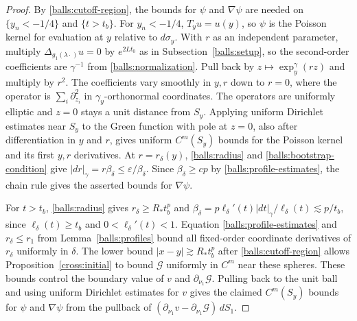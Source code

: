 \documentclass[11pt,a4paper]{article}
\theoremstyle{definition}
\theoremstyle{remark}
\numberwithin{equation}{section}
\begin{document}
\begin{proof}
By \eqref{balls:cutoff-region}, the bounds for $\psi$ and $\nabla\psi$
are needed on $\{y_n<-1/4\}$ and $\{t>t_b\}$. For $y_n<-1/4$,
$T_yu=u(y)$, so $\psi$ is the Poisson kernel for evaluation at $y$
relative to $d\sigma_y$. With $r$ as an independent parameter, multiply
$\Delta_{g_1(\lambda\cdot)}u=0$ by $e^{2Lt_0}$ as in
Subsection~\ref{balls:setup}, so the second-order coefficients are
$\gamma^{-1}$ from \eqref{balls:normalization}. Pull back by
$z\mapsto\exp_y^\gamma(rz)$ and multiply by $r^2$.
The coefficients vary smoothly in $y,r$ down to $r=0$, where the
operator is $\sum_i\partial_{z_i}^2$ in $\gamma_y$-orthonormal
coordinates. The operators are uniformly elliptic and $z=0$ stays
a unit distance from $S_y$. Applying uniform Dirichlet estimates
near $S_y$ to the Green function with pole at $z=0$, also after
differentiation in $y$ and $r$, gives uniform $C^m(S_y)$ bounds
for the Poisson kernel and its first $y,r$ derivatives.
At $r=r_\delta(y)$, \eqref{balls:radius} and
\eqref{balls:bootstrap-condition} give
$|dr|_\gamma=r\beta_\delta\leq\varepsilon/\beta_\delta$.
Since $\beta_\delta\geq cp$ by \eqref{balls:profile-estimates},
the chain rule gives the asserted bounds for $\nabla\psi$.

For $t>t_b$, \eqref{balls:radius} gives $r_\delta\geq R_*t_b^p$ and
$\beta_\delta=p\ell_\delta'(t)|dt|_\gamma/\ell_\delta(t)\lesssim p/t_b$,
since $\ell_\delta(t)\geq t_b$ and $0<\ell_\delta'(t)<1$.
Equation \eqref{balls:profile-estimates} and $r_\delta\leq r_1$ from
Lemma~\ref{balls:profiles} bound all fixed-order coordinate
derivatives of $r_\delta$ uniformly in $\delta$.
The lower bound $|x-y|\gtrsim R_*t_b^p$ after
\eqref{balls:cutoff-region} allows Proposition~\ref{cross:initial}
to bound $\mathcal G$ uniformly in $C^m$ near these spheres.
These bounds control the boundary value of $v$ and
$\partial_{\nu_1}\mathcal G$. Pulling back to the unit ball and using
uniform Dirichlet estimates for $v$ gives the claimed $C^m(S_y)$
bounds for $\psi$ and $\nabla\psi$ from the pullback of
$(\partial_{\nu_1}v-\partial_{\nu_1}\mathcal G)\,dS_1$.
\end{proof}
\end{document}
